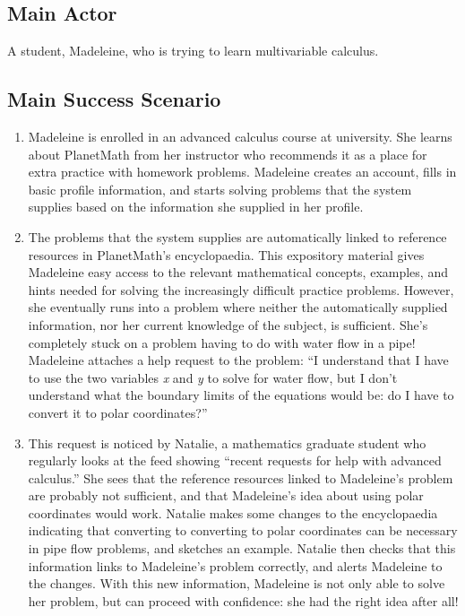 \subsection{Main Actor}

A student, Madeleine, who is trying to learn multivariable calculus.

\subsection{Main Success Scenario}

\begin{enumerate}
\item
  Madeleine is enrolled in an advanced calculus course at university.
  She learns about PlanetMath from her instructor who recommends it as a
  place for extra practice with homework problems. Madeleine creates an
  account, fills in basic profile information, and starts solving
  problems that the system supplies based on the information she
  supplied in her profile.
\item
  The problems that the system supplies are automatically linked to
  reference resources in PlanetMath's encyclopaedia. This expository
  material gives Madeleine easy access to the relevant mathematical
  concepts, examples, and hints needed for solving the increasingly
  difficult practice problems. However, she eventually runs into a
  problem where neither the automatically supplied information, nor her
  current knowledge of the subject, is sufficient. She's completely
  stuck on a problem having to do with water flow in a pipe! Madeleine
  attaches a help request to the problem: ``I understand that I have to
  use the two variables \emph{x} and \emph{y} to solve for water flow,
  but I don't understand what the boundary limits of the equations would
  be: do I have to convert it to polar coordinates?''
\item
  This request is noticed by Natalie, a mathematics graduate student who
  regularly looks at the feed showing ``recent requests for help with
  advanced calculus.'' She sees that the reference resources linked to
  Madeleine's problem are probably not sufficient, and that Madeleine's
  idea about using polar coordinates would work. Natalie makes some
  changes to the encyclopaedia indicating that converting to converting
  to polar coordinates can be necessary in pipe flow problems, and
  sketches an example. Natalie then checks that this information links
  to Madeleine's problem correctly, and alerts Madeleine to the changes.
  With this new information, Madeleine is not only able to solve her
  problem, but can proceed with confidence: she had the right idea after
  all!
\end{enumerate}

